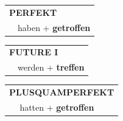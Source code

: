 \documentclass[10pt,a4paper]{revtex4-2}
\begin{document}
\begin{verbbox-acc}
    \vspace{10pt}

 \begin{tabular}{rl}
     \multicolumn{2}{l}{\textbf{PERFEKT}}\\
  &  haben + \textbf{getroffen}\\
  \end{tabular}
\hfill
   \begin{tabular}{rl}
   
    \multicolumn{2}{l}{\textbf{FUTURE I} }\\
  &  werden + \textbf{treffen}\\
 
  \end{tabular}
\hfill
   \begin{tabular}{rl}
      \multicolumn{2}{l}{\textbf{PLUSQUAMPERFEKT}}\\
   & hatten + \textbf{getroffen}\\
  \end{tabular}
  
  \vspace{-5pt}


\end{verbbox-acc}
\end{document}
